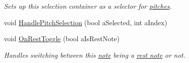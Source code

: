 \begin{DoxyCompactItemize}
\begin{DoxyCompactList}\small\item\em Sets up this selection container as a selector for \hyperlink{group___music_enums_ga508f69b199ea518f935486c990edac1d}{pitches}. \end{DoxyCompactList}\item 
void \hyperlink{group___s_c___p_s_c_handlers_gaa2afa8167100515d412cf751d9334f0c}{Handle\+Pitch\+Selection} (bool a\+Selected, int a\+Index)
\item 
void \hyperlink{group___s_c___p_s_c_handlers_ga8715b5976fdae2c56e05a60832553864}{On\+Rest\+Toggle} (bool a\+Is\+Rest\+Note)
\begin{DoxyCompactList}\small\item\em Handles switching between this \hyperlink{group___music_structs_struct_music_1_1_combined_note}{note} being a \hyperlink{group___doc_s_c___p_s_c_DocSC_PSCRest}{rest note} or not. \end{DoxyCompactList}\end{DoxyCompactItemize}

